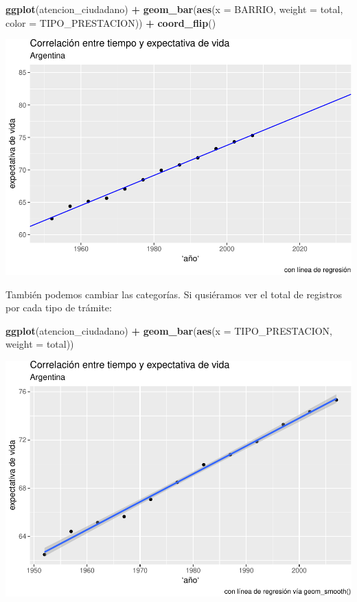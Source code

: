 \documentclass[]{book}
\newenvironment{Shaded}{\begin{snugshade}}{\end{snugshade}}
\newcommand{\KeywordTok}[1]{\textcolor[rgb]{0.13,0.29,0.53}{\textbf{#1}}}
\newcommand{\DataTypeTok}[1]{\textcolor[rgb]{0.13,0.29,0.53}{#1}}
\newcommand{\StringTok}[1]{\textcolor[rgb]{0.31,0.60,0.02}{#1}}
\newcommand{\OperatorTok}[1]{\textcolor[rgb]{0.81,0.36,0.00}{\textbf{#1}}}
\newcommand{\NormalTok}[1]{#1}
\begin{document}
\begin{Shaded}
\begin{Highlighting}[]
\KeywordTok{ggplot}\NormalTok{(atencion_ciudadano) }\OperatorTok{+}
\StringTok{    }\KeywordTok{geom_bar}\NormalTok{(}\KeywordTok{aes}\NormalTok{(}\DataTypeTok{x =}\NormalTok{ BARRIO, }\DataTypeTok{weight =}\NormalTok{ total, }\DataTypeTok{color =}\NormalTok{ TIPO_PRESTACION)) }\OperatorTok{+}
\StringTok{    }\KeywordTok{coord_flip}\NormalTok{()}
\end{Highlighting}
\end{Shaded}

\includegraphics{ciencia_de_datos_politicas_publicas_files/figure-latex/unnamed-chunk-96-1.pdf}

También podemos cambiar las categorías. Si qusiéramos ver el total de
registros por cada tipo de trámite:

\begin{Shaded}
\begin{Highlighting}[]
\KeywordTok{ggplot}\NormalTok{(atencion_ciudadano) }\OperatorTok{+}
\StringTok{    }\KeywordTok{geom_bar}\NormalTok{(}\KeywordTok{aes}\NormalTok{(}\DataTypeTok{x =}\NormalTok{ TIPO_PRESTACION, }\DataTypeTok{weight =}\NormalTok{ total)) }
\end{Highlighting}
\end{Shaded}

\includegraphics{ciencia_de_datos_politicas_publicas_files/figure-latex/unnamed-chunk-97-1.pdf}
\end{document}
